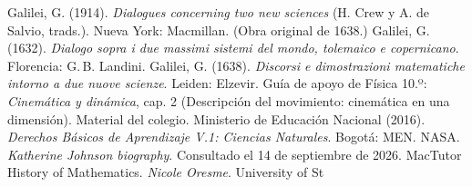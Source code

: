 \documentclass[11pt]{article}
\begin{document}
\begin{referencias}
 Galilei, G. (1914). \emph{Dialogues concerning two new sciences}
  (H. Crew y A. de Salvio, trads.). Nueva York: Macmillan. (Obra original de 1638.)
 Galilei, G. (1632). \emph{Dialogo sopra i due massimi sistemi del
  mondo, tolemaico e copernicano}. Florencia: G.\,B. Landini.
 Galilei, G. (1638). \emph{Discorsi e dimostrazioni matematiche intorno
  a due nuove scienze}. Leiden: Elzevir.
 Guía de apoyo de Física 10.º: \emph{Cinemática y dinámica}, cap. 2
  (Descripción del movimiento: cinemática en una dimensión). Material del colegio.
 Ministerio de Educación Nacional (2016). \emph{Derechos Básicos de
  Aprendizaje V.1: Ciencias Naturales}. Bogotá: MEN.
 NASA. \emph{Katherine Johnson biography}. Consultado el 14 de
  septiembre de 2026.
 MacTutor History of Mathematics. \emph{Nicole Oresme}. University of St

\end{referencias}
\end{document}
